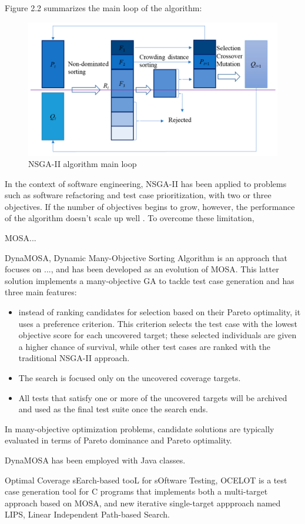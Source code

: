 Figure 2.2 summarizes the main loop of the algorithm:
\begin{figure}[!h]
    \centering
    \includegraphics[scale=0.1]{./figures/nsga-ii.png}
    \caption{NSGA-II algorithm main loop}
    \label{fig:NSGA-II algorithm main loop}
\end{figure}


In the context of software engineering, NSGA-II has been applied to problems such as software refactoring and test case prioritization,
with two or three objectives. If the number of objectives begins to grow, however, the performance of the algorithm doesn't scale up well \cite{article3}.
To overcome these limitation,


MOSA...

DynaMOSA, Dynamic Many-Objective Sorting Algorithm \cite{article1} is an approach that focuses on ..., and has been developed as an evolution of MOSA. This latter solution implements a many-objective GA to tackle test case generation and has three main features: 
\begin{itemize}
    \item instead of ranking candidates for selection based on their Pareto optimality, it uses a preference criterion. This criterion selects the test case with the lowest objective score for each uncovered target; these selected individuals are given a higher chance of survival, while other test cases are ranked with the traditional NSGA-II approach.
    \item The search is focused only on the uncovered coverage targets.
    \item All tests that satisfy one or more of the uncovered targets will be archived and used as the final test suite once the search ends.
\end{itemize}

In many-objective optimization problems, candidate solutions are typically evaluated in terms of Pareto dominance and Pareto optimality.

DynaMOSA has been employed with Java classes.



Optimal Coverage sEarch-based tooL for sOftware Testing, OCELOT \cite{article4} is a test case generation tool for C programs that implements both a multi-target approach based on MOSA, and new iterative single-target appproach named LIPS, Linear Independent Path-based Search.